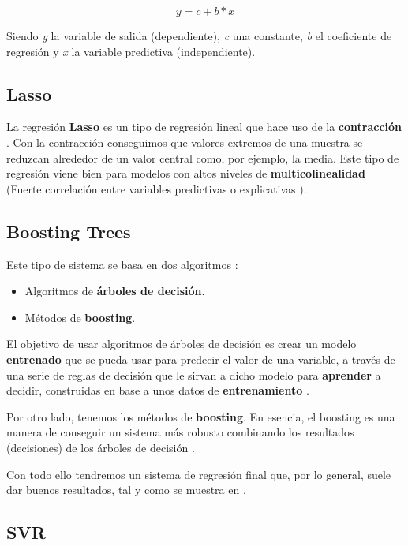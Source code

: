 \begin{equation}
y = c + b*x
\end{equation}

Siendo \textit{y} la variable de salida (dependiente), \textit{c} una constante, \textit{b} el coeficiente de regresión y \textit{x} la variable predictiva (independiente).

\subsection{Lasso}

La regresión \textbf{Lasso} \cite{lasso} es un tipo de regresión lineal que hace uso de la \textbf{contracción} \cite{shrinkage}. Con la contracción conseguimos que valores extremos de una muestra se reduzcan alrededor de un valor central como, por ejemplo, la media. Este tipo de regresión viene bien para modelos con altos niveles de \textbf{multicolinealidad} (Fuerte correlación entre variables predictivas o explicativas \cite{multicollinearity}).

\subsection{Boosting Trees}

Este tipo de sistema se basa en dos algoritmos \cite{boosting-trees}:

\begin{itemize}
\item Algoritmos de \textbf{árboles de decisión}.
\item Métodos de \textbf{boosting}.
\end{itemize}

El objetivo de usar algoritmos de árboles de decisión es crear un modelo \textbf{entrenado} que se pueda usar para predecir el valor de una variable, a través de una serie de reglas de decisión que le sirvan a dicho modelo para \textbf{aprender} a decidir, construidas en base a unos datos de \textbf{entrenamiento} \cite{decision-tree}.

Por otro lado, tenemos los métodos de \textbf{boosting}. En esencia, el boosting es una manera de conseguir un sistema más robusto combinando los resultados (decisiones) de los árboles de decisión \cite{boosting}.

Con todo ello tendremos un sistema de regresión final que, por lo general, suele dar buenos resultados, tal y como se muestra en \cite{isa2}.

\subsection{SVR}


